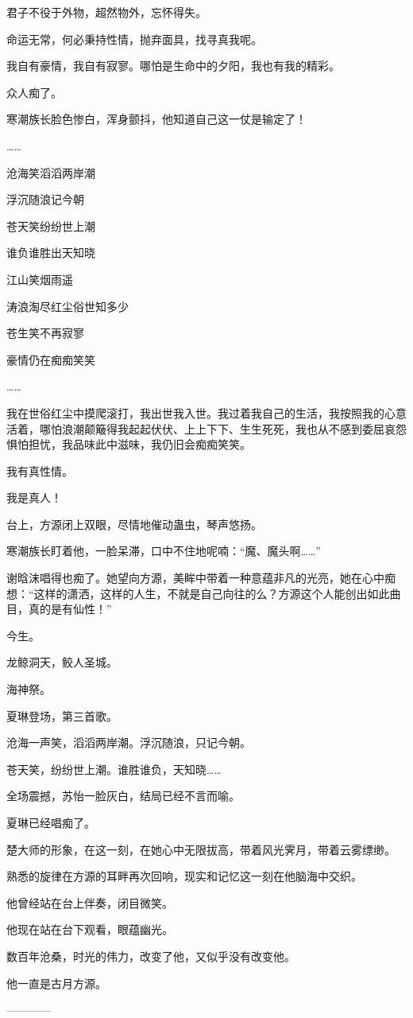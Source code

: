 \begin{this_body}
君子不役于外物，超然物外，忘怀得失。

命运无常，何必秉持性情，抛弃面具，找寻真我呢。

我自有豪情，我自有寂寥。哪怕是生命中的夕阳，我也有我的精彩。

众人痴了。

寒潮族长脸色惨白，浑身颤抖，他知道自己这一仗是输定了！

……

沧海笑滔滔两岸潮

浮沉随浪记今朝

苍天笑纷纷世上潮

谁负谁胜出天知晓

江山笑烟雨遥

涛浪淘尽红尘俗世知多少

苍生笑不再寂寥

豪情仍在痴痴笑笑

……

我在世俗红尘中摸爬滚打，我出世我入世。我过着我自己的生活，我按照我的心意活着，哪怕浪潮颠簸得我起起伏伏、上上下下、生生死死，我也从不感到委屈哀怨惧怕担忧，我品味此中滋味，我仍旧会痴痴笑笑。

我有真性情。

我是真人！

台上，方源闭上双眼，尽情地催动蛊虫，琴声悠扬。

寒潮族长盯着他，一脸呆滞，口中不住地呢喃：“魔、魔头啊……”

谢晗沫唱得也痴了。她望向方源，美眸中带着一种意蕴非凡的光亮，她在心中痴想：“这样的潇洒，这样的人生，不就是自己向往的么？方源这个人能创出如此曲目，真的是有仙性！”

今生。

龙鲸洞天，鲛人圣城。

海神祭。

夏琳登场，第三首歌。

沧海一声笑，滔滔两岸潮。浮沉随浪，只记今朝。

苍天笑，纷纷世上潮。谁胜谁负，天知晓……

全场震撼，苏怡一脸灰白，结局已经不言而喻。

夏琳已经唱痴了。

楚大师的形象，在这一刻，在她心中无限拔高，带着风光霁月，带着云雾缥缈。

熟悉的旋律在方源的耳畔再次回响，现实和记忆这一刻在他脑海中交织。

他曾经站在台上伴奏，闭目微笑。

他现在站在台下观看，眼蕴幽光。

数百年沧桑，时光的伟力，改变了他，又似乎没有改变他。

他一直是古月方源。

------------

\end{this_body}

